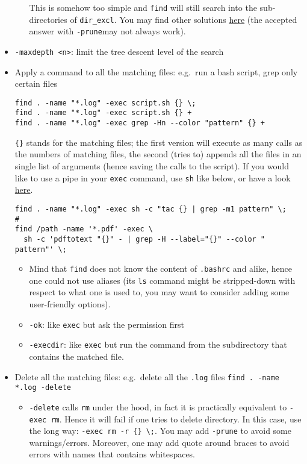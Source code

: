 \documentclass[a4paper,12pt,%
              final%
              ]{article}
\begin{document}
\begin{itemize}
\begin{itemize}
        This is somehow too simple and \texttt{find} will still search into the sub-directories of \verb|dir_excl|. You may find other solutions \href{https://stackoverflow.com/questions/4210042/how-to-exclude-a-directory-in-find-command}{here} (the accepted answer with \verb|-prune|may not always work).
    \end{itemize}
  \item \verb|-maxdepth <n>|: limit the tree descent level of the search
  \item Apply a command to all the matching files: e.g.\ run a bash script, grep only certain files
\begin{verbatim}
find . -name "*.log" -exec script.sh {} \;
find . -name "*.log" -exec script.sh {} +
find . -name "*.log" -exec grep -Hn --color "pattern" {} +
\end{verbatim}
    \verb|{}| stands for the matching files; the first version will execute as many calls as the numbers of matching files, the second (tries to) appends all the files in an single list of arguments (hence saving the calls to the script). If you would like to use a pipe in your \texttt{exec} command, use \texttt{sh} like below, or have a look \href{https://stackoverflow.com/questions/307015/how-do-i-include-a-pipe-in-my-linux-find-exec-command}{here}.
\begin{verbatim}
find . -name "*.log" -exec sh -c "tac {} | grep -m1 pattern" \;
#
find /path -name '*.pdf' -exec \
  sh -c 'pdftotext "{}" - | grep -H --label="{}" --color " pattern"' \;
\end{verbatim}
  \begin{itemize}
    \item Mind that \texttt{find} does not know the content of \texttt{.bashrc} and alike, hence one could not use aliases (its \texttt{ls} command might be stripped-down with respect to what one is used to, you may want to consider adding some user-friendly options).
  \end{itemize}
  \begin{itemize}
    \item \verb|-ok|: like \texttt{exec} but ask the permission first
    \item \verb|-execdir|: like \texttt{exec} but run the command from the subdirectory that contains the matched file.
  \end{itemize}
  \item Delete all the matching files: e.g.\ delete all the \texttt{.log} files \texttt{find . -name *.log -delete}
    \begin{itemize}
      \item \texttt{-delete} calls \texttt{rm} under the hood, in fact it is practically equivalent to \texttt{-exec rm}. Hence it will fail if one tries to delete directory. In this case, use the long way: \verb|-exec rm -r {} \;|. You may add \verb|-prune| to avoid some warnings/errors. Moreover, one may add quote around braces to avoid errors with names that contains whitespaces.
    \end{itemize}
\end{itemize}
\end{document}
